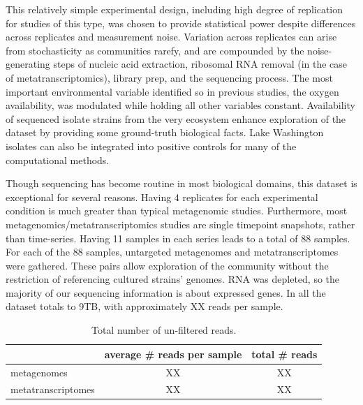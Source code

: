 This relatively simple experimental design, including high degree of replication for studies of this type, was chosen to provide statistical power despite differences across replicates and measurement noise.
Variation across replicates can arise from stochasticity as communities rarefy, and are compounded by the noise-generating steps of nucleic acid extraction, ribosomal RNA removal (in the case of metatranscriptomics), library prep, and the sequencing process.
The most important environmental variable identified so in previous studies, the oxygen availability, was modulated while holding all other variables constant.
Availability of sequenced isolate strains from the very ecosystem enhance exploration of the dataset by providing some ground-truth biological facts.
Lake Washington isolates can also be integrated into positive controls for many of the computational methods.

Though sequencing has become routine in most biological domains, this dataset is exceptional for several reasons.
Having 4 replicates for each experimental condition is much greater than typical metagenomic studies.
Furthermore, most metagenomics/metatranscriptomics studies are single timepoint snapshots, rather than time-series.
Having 11 samples in each series leads to a total of 88 samples.
For each of the 88 samples, untargeted metagenomes and metatranscriptomes were gathered.
These pairs allow exploration of the community without the restriction of referencing cultured strains' genomes.
RNA was depleted, so the majority of our sequencing information is about expressed genes.
In all the dataset totals to 9TB, with approximately XX reads per sample.

\begin{table}[H]
\centering
\begin{tabular}{l | cc}
        & average \# reads per sample & total \# reads \\
\midrule
	metagenomes & XX & XX \\
	metatranscriptomes & XX & XX \\
\end{tabular}
\caption{Total number of un-filtered reads.}
\label{table:sample_read_sizes}
\end{table}

